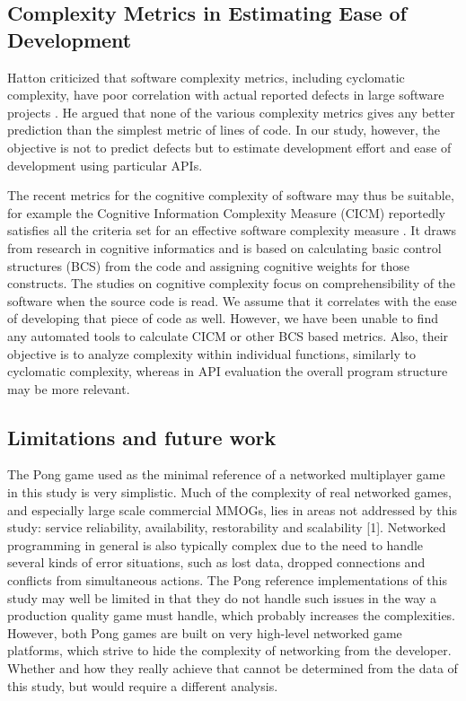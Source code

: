 \documentclass[conference]{IEEEtran}
\begin{document}
\subsection{Complexity Metrics in Estimating Ease of Development}

Hatton criticized that software complexity metrics, including
cyclomatic complexity, have poor correlation with actual reported
defects in large software projects \cite{hatton}. He argued that none
of the various complexity metrics gives any better prediction than the
simplest metric of lines of code. In our study, however, the objective
is not to predict defects but to estimate development effort and ease
of development using particular APIs.

The recent metrics for the cognitive complexity of software may thus
be suitable, for example the Cognitive Information Complexity Measure
(CICM) reportedly satisfies all the criteria set for an effective
software complexity measure \cite{cicm}. It draws from research in
cognitive informatics and is based on calculating basic control
structures (BCS) from the code and assigning cognitive weights for
those constructs. The studies on cognitive complexity focus on
comprehensibility of the software when the source code is read. We
assume that it correlates with the ease of developing that piece of
code as well. However, we have been unable to find any automated tools
to calculate CICM or other BCS based metrics. Also, their objective is
to analyze complexity within individual functions, similarly to
cyclomatic complexity, whereas in API evaluation the overall program
structure may be more relevant.

\subsection{Limitations and future work}

The Pong game used as the minimal reference of a networked multiplayer
game in this study is very simplistic. Much of the complexity of real
networked games, and especially large scale commercial MMOGs, lies in
areas not addressed by this study: service reliability, availability,
restorability and scalability [1]. Networked programming in general is
also typically complex due to the need to handle several kinds of
error situations, such as lost data, dropped connections and conflicts
from simultaneous actions. The Pong reference implementations of this
study may well be limited in that they do not handle such issues in
the way a production quality game must handle, which probably
increases the complexities. However, both Pong games are built on very
high-level networked game platforms, which strive to hide the
complexity of networking from the developer. Whether and how they
really achieve that cannot be determined from the data of this study,
but would require a different analysis.
\end{document}

